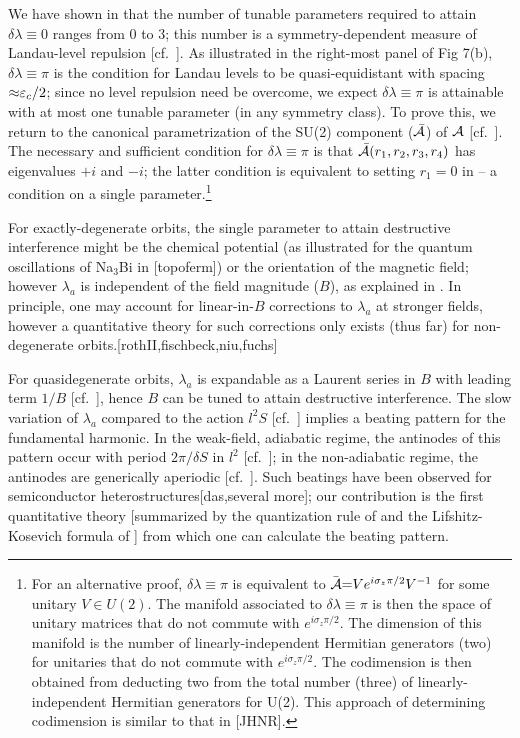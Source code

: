 \documentclass[aps, prb, showpacs, twocolumn, notitlepage, superscriptaddress]{revtex4-1}
\begin{document}

We have shown in  that  the number of tunable parameters required to attain  $\delta \lambda{\equiv}0$ ranges from $0$ to $3$; this number is a symmetry-dependent measure of Landau-level repulsion [cf.\ ]. As illustrated in the right-most panel of Fig 7(b), $\delta \lambda{\equiv}\pi$ is the condition  for Landau levels to be quasi-equidistant  with spacing ${\approx}\varepsilon_c/2$; since no level repulsion need be overcome,
we expect $\delta \lambda{\equiv}\pi$ is attainable with at most one tunable parameter (in any symmetry class). To prove this, we return to the canonical parametrization of the SU(2) component (${\cal \bar{A}}$) of ${\cal A}$ [cf.\ ]. The necessary and sufficient condition for $\delta \lambda{\equiv}\pi$ is that ${\cal \bar{A}}(r_1,r_2,r_3,r_4)$ has eigenvalues $+i$ and $-i$; the latter condition is equivalent to setting $r_1{=}0$ in  -- a condition on a single parameter.\footnote{For an alternative proof,   $\delta \lambda{\equiv}\pi$ is equivalent to ${ \bar{\cal A}}{=}Ve^{i\sigma_z\pi/2}V^{-1}$ for some unitary $V\in U(2)$. The manifold associated to $\delta \lambda{\equiv}\pi$ is then the space of unitary matrices  that do not commute with $e^{i\sigma_z\pi/2}$.  The dimension of this manifold is the number of linearly-independent Hermitian generators (two) for unitaries that do not commute with $e^{i\sigma_z\pi/2}$. The codimension is then obtained from deducting two from the total number (three)  of linearly-independent Hermitian generators  for U(2). This approach of determining codimension is similar to that in [JHNR].} 

For exactly-degenerate orbits, the single parameter to attain destructive interference might be the chemical potential (as illustrated for the quantum oscillations of Na$_3$Bi in [topoferm]) or the orientation of the magnetic field; however $\lambda_a$ is independent of the field magnitude ($B$), as explained in . In principle, one may account for linear-in-$B$ corrections to $\lambda_a$ at stronger fields, however a quantitative theory for such corrections only exists (thus far) for non-degenerate orbits.[rothII,fischbeck,niu,fuchs] 

For quasidegenerate orbits,  $\lambda_a$ is expandable as a Laurent series in $B$ with leading term $1/B$ [cf.\ ], hence $B$ can be tuned to attain destructive interference. The slow variation of $\lambda_a$ compared to the action $l^2S$ [cf.\ ] implies a beating pattern for the fundamental harmonic. In the weak-field, adiabatic regime, the antinodes of this pattern occur with period $2\pi/\delta S$ in $l^2$ [cf.\ ]; in the non-adiabatic regime, the antinodes are generically aperiodic [cf.\ ]. Such beatings have been observed for semiconductor heterostructures[das,several more]; our contribution is the first quantitative theory  [summarized by the quantization rule of  and the Lifshitz-Kosevich formula of ] from which one can calculate the beating pattern.  
\end{document}

